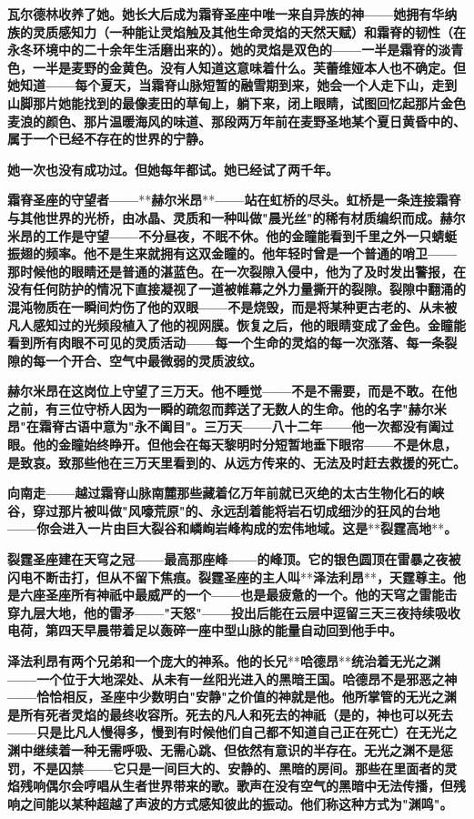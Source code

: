 \documentclass[12pt,a4paper,openany]{ctexbook}
\begin{document}
\textbf{瓦尔德林收养了她。她长大后成为霜脊圣座中唯一来自异族的神——她拥有华纳族的灵质感知力（一种能让灵焰触及其他生命灵焰的天然天赋）和霜脊的韧性（在永冬环境中的二十余年生活磨出来的）。她的灵焰是双色的——一半是霜脊的淡青色，一半是麦野的金黄色。没有人知道这意味着什么。芙蕾维娅本人也不确定。但她知道——每个夏天，当霜脊山脉短暂的融雪期到来，她会一个人走下山，走到山脚那片她能找到的最像麦田的草甸上，躺下来，闭上眼睛，试图回忆起那片金色麦浪的颜色、那片温暖海风的味道、那段两万年前在麦野圣地某个夏日黄昏中的、属于一个已经不存在的世界的宁静。}


\textbf{她一次也没有成功过。但她每年都试。她已经试了两千年。}


\textbf{霜脊圣座的守望者——}**\textbf{赫尔米昂}**\textbf{——站在虹桥的尽头。虹桥是一条连接霜脊与其他世界的光桥，由冰晶、灵质和一种叫做"晨光丝"的稀有材质编织而成。赫尔米昂的工作是守望——不分昼夜，不眠不休。他的金瞳能看到千里之外一只蜻蜓振翅的频率。他不是生来就拥有这双金瞳的。他年轻时曾是一个普通的哨卫——那时候他的眼睛还是普通的湛蓝色。在一次裂隙入侵中，他为了及时发出警报，在没有任何防护的情况下直接凝视了一道被帷幕之外力量撕开的裂隙。裂隙中翻涌的混沌物质在一瞬间灼伤了他的双眼——不是烧毁，而是将某种更古老的、从未被凡人感知过的光频段植入了他的视网膜。恢复之后，他的眼睛变成了金色。金瞳能看到所有肉眼不可见的灵质活动——每一个生命的灵焰的每一次涨落、每一条裂隙的每一个开合、空气中最微弱的灵质波纹。}


\textbf{赫尔米昂在这岗位上守望了三万天。他不睡觉——不是不需要，而是不敢。在他之前，有三位守桥人因为一瞬的疏忽而葬送了无数人的生命。他的名字"赫尔米昂"在霜脊古语中意为"永不阖目"。三万天——八十二年——他一次都没有阖过眼。他的金瞳始终睁开。但他会在每天黎明时分短暂地垂下眼帘——不是休息，是致哀。致那些他在三万天里看到的、从远方传来的、无法及时赶去救援的死亡。}


\textbf{向南走——越过霜脊山脉南麓那些藏着亿万年前就已灭绝的太古生物化石的峡谷，穿过那片被叫做"风嚎荒原"的、永远刮着能将岩石切成细沙的狂风的台地——你会进入一片由巨大裂谷和嶙峋岩峰构成的宏伟地域。这是}**\textbf{裂霆高地}**\textbf{。}


\textbf{裂霆圣座建在天穹之冠——最高那座峰——的峰顶。它的银色圆顶在雷暴之夜被闪电不断击打，但从不留下焦痕。裂霆圣座的主人叫}**\textbf{泽法利昂}**\textbf{，天霆尊主。他是六座圣座所有神祇中最威严的一个——也是最疲惫的一个。他的天穹之雷能击穿九层大地，他的雷矛——"天怒"——投出后能在云层中逗留三天三夜持续吸收电荷，第四天早晨带着足以轰碎一座中型山脉的能量自动回到他手中。}


\textbf{泽法利昂有两个兄弟和一个庞大的神系。他的长兄}**\textbf{哈德昂}**\textbf{统治着无光之渊——一个位于大地深处、从未有一丝阳光进入的黑暗王国。哈德昂不是邪恶之神——恰恰相反，圣座中少数明白"安静"之价值的神就是他。他所掌管的无光之渊是所有死者灵焰的最终收容所。死去的凡人和死去的神祇（是的，神也可以死去——只是比凡人慢得多，慢到有时候他们自己都不知道自己正在死亡）在无光之渊中继续着一种无需呼吸、无需心跳、但依然有意识的半存在。无光之渊不是惩罚，不是囚禁——它只是一间巨大的、安静的、黑暗的房间。那些在里面者的灵焰残响偶尔会哼唱从生者世界带来的歌。歌声在没有空气的黑暗中无法传播，但残响之间能以某种超越了声波的方式感知彼此的振动。他们称这种方式为"渊鸣"。}
\end{document}
